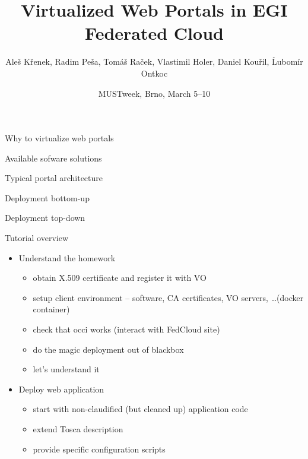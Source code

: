 \documentclass[smaller,t]{beamer}
\begin{document}
\makeatletter

\title{Virtualized Web Portals in EGI \\[\smallskipamount] Federated Cloud}
\date{MUSTweek, Brno, March 5--10}
\author[A. Křenek et al.]{Aleš Křenek, Radim Peša, Tomáš Raček, Vlastimil Holer, Daniel Kouřil, Ĺubomír Ontkoc}
\begin{frame}
\maketitle
\end{frame}

\begin{frame}{Why to virtualize web portals}

\end{frame}

\begin{frame}{Available sofware solutions}

\end{frame}

\begin{frame}{Typical portal architecture}

\end{frame}

\begin{frame}{Deployment bottom-up}

\end{frame}

\begin{frame}{Deployment top-down}

\end{frame}

\begin{frame}{Tutorial overview}
\begin{itemize}
\item Understand the homework 
\begin{itemize}
\item obtain X.509 certificate and register it with VO
\item setup client environment -- software, CA certificates, VO servers, \dots (docker container)
\item check that occi works (interact with FedCloud site)
\item do the magic deployment out of blackbox 
\item \alert{let's understand it}
\end{itemize}
\item Deploy web application 
\begin{itemize}
\item start with non-claudified (but cleaned up) application code
\item \alert{extend Tosca description}
\item \alert{provide specific configuration scripts}
\end{itemize}
\end{itemize}
\end{frame}
\end{document}
